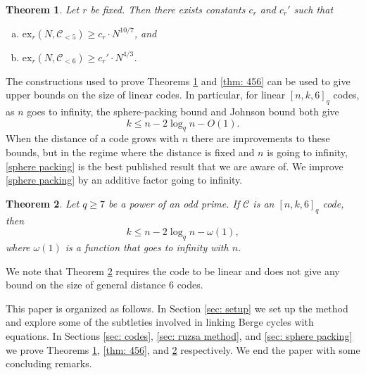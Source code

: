 \documentclass[12pt]{article}%
\newtheorem{theorem}{Theorem}[section]
\begin{document}
\begin{theorem}\label{thm: graphs from codes}
    Let $r$ be fixed. Then there exists constants $c_r$ and $c_r'$ such that \begin{enumerate}[(a)]\item $\mathrm{ex}_r(N, \mathcal{C}_{<5})  \geq c_r \cdot N^{10/7}$, and
 \item $\mathrm{ex}_r(N, \mathcal{C}_{<6}) \geq c_r'\cdot N^{4/3}$.
    \end{enumerate}
\end{theorem}


The constructions used to prove Theorems \ref{thm: graphs from codes} and \ref{thm: 456} can be used to give upper bounds on the size of linear codes. In particular, for linear $[n,k,6]_q$ codes, as $n$ goes to infinity, the sphere-packing bound and Johnson bound \cite{johnson1962new, roth2006} both give
\begin{equation}\label{sphere packing}
k\leq n - 2\log_q n - O(1).
\end{equation}
When the distance of a code grows with $n$ there are improvements to these bounds, but in the regime where the distance is fixed and $n$ is going to infinity, \eqref{sphere packing} is the best published result that we are aware of. We improve \eqref{sphere packing} by an additive factor going to infinity. 


\begin{theorem}\label{distance 6 code upper bound}
  Let $q \geq 7$ be a power of an odd prime. If $\mathcal{C}$ is an $[n,k,6]_q$ code, then 
    \[
    k\leq n - 2\log_q n - \omega(1),
    \]
    where $\omega(1)$ is a function that goes to infinity with $n$.
\end{theorem}

We note that Theorem \ref{distance 6 code upper bound} requires the code to be linear and does not give any bound on the size of general distance $6$ codes.


This paper is organized as follows. In Section \ref{sec: setup} we set up the method and explore some of the subtleties involved in linking Berge cycles with equations. In Sections \ref{sec: codes}, \ref{sec: ruzsa method}, and \ref{sec: sphere packing} we prove Theorems \ref{thm: graphs from codes}, \ref{thm: 456}, and \ref{distance 6 code upper bound} respectively. We end the paper with some concluding remarks. 
\end{document}
